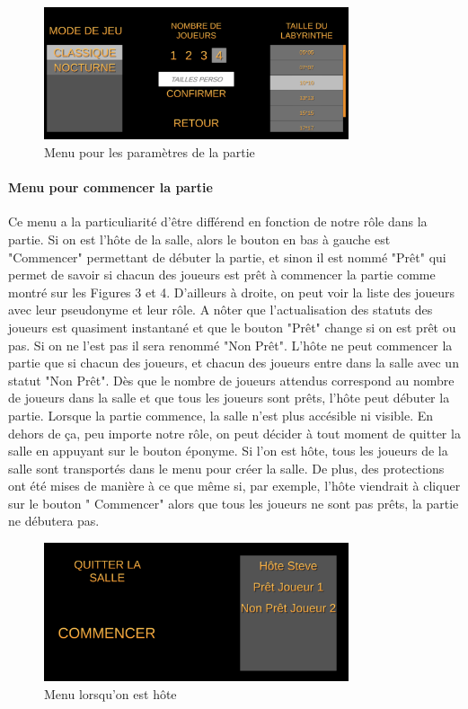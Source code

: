 \documentclass{article}
\begin{document}
\begin{figure}[!ht]
    \centering
    \includegraphics[width=0.8\textwidth]{Menu2.png}
    \caption{Menu pour les paramètres de la partie}
    \label{Menu pour les paramètres de la partie}
\end{figure}


\paragraph{Menu pour commencer la partie}

Ce menu a la particuliarité d'être différend en fonction de notre rôle dans la partie. Si on est l'hôte de la salle, alors le bouton en bas à gauche est "Commencer" permettant de débuter la partie, et sinon il est nommé "Prêt" qui permet de savoir si chacun des joueurs est prêt à commencer la partie comme montré sur les Figures 3 et 4. D'ailleurs à droite, on peut voir la liste des joueurs avec leur pseudonyme et leur rôle. A nôter que l'actualisation des statuts des joueurs est quasiment instantané et que le bouton "Prêt" change si on est prêt ou pas. Si on ne l'est pas il sera renommé "Non Prêt". L'hôte ne peut commencer la partie que si chacun des joueurs, et chacun des joueurs entre dans la salle avec un statut "Non Prêt". Dès que le nombre de joueurs attendus correspond au nombre de joueurs dans la salle et que tous les joueurs sont prêts, l'hôte peut débuter la partie. Lorsque la partie commence, la salle n'est plus accésible ni visible. En dehors de ça, peu importe notre rôle, on peut décider à tout moment de quitter la salle en appuyant sur le bouton éponyme. Si l'on est hôte, tous les joueurs de la salle sont transportés dans le menu pour créer la salle. De plus, des protections ont été mises de manière à ce que même si, par exemple, l'hôte viendrait à cliquer sur le bouton "	Commencer" alors que tous les joueurs ne sont pas prêts, la partie ne débutera pas.

\newpage
\begin{figure}[!ht]
    \centering
    \includegraphics[width=0.8\textwidth]{Menu31.png}
    \caption{Menu lorsqu'on est hôte}
    \label{Menu lorsqu'on est hôte}
\end{figure}
\end{document}
